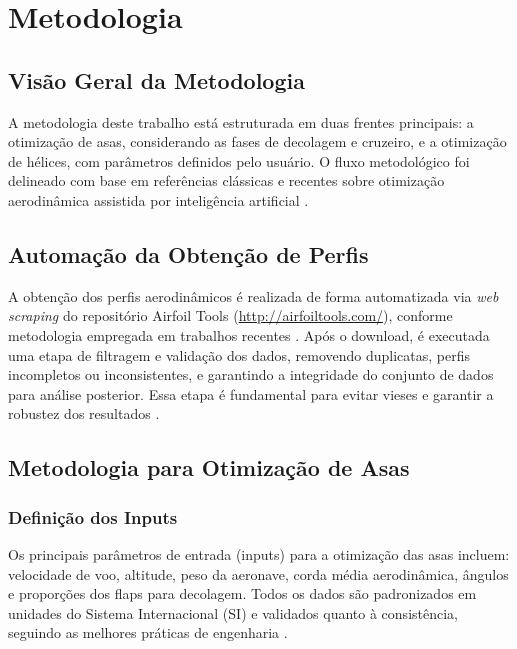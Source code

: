 \chapter{Metodologia}

\section{Visão Geral da Metodologia}
A metodologia deste trabalho está estruturada em duas frentes principais: a otimização de asas, considerando as fases de decolagem e cruzeiro, e a otimização de hélices, com parâmetros definidos pelo usuário. O fluxo metodológico foi delineado com base em referências clássicas e recentes sobre otimização aerodinâmica assistida por inteligência artificial \cite{oliveira2023, hasan2024, wu2024}.

\section{Automação da Obtenção de Perfis}
\label{sec:automacao}
A obtenção dos perfis aerodinâmicos é realizada de forma automatizada via \textit{web scraping} do repositório Airfoil Tools (\url{http://airfoiltools.com/}), conforme metodologia empregada em trabalhos recentes \cite{oliveira2023}. Após o download, é executada uma etapa de filtragem e validação dos dados, removendo duplicatas, perfis incompletos ou inconsistentes, e garantindo a integridade do conjunto de dados para análise posterior. Essa etapa é fundamental para evitar vieses e garantir a robustez dos resultados \cite{abbott1959theory}.

\section{Metodologia para Otimização de Asas}
\subsection{Definição dos Inputs}
\label{subsec:inputs}
Os principais parâmetros de entrada (inputs) para a otimização das asas incluem: velocidade de voo, altitude, peso da aeronave, corda média aerodinâmica, ângulos e proporções dos flaps para decolagem. Todos os dados são padronizados em unidades do Sistema Internacional (SI) e validados quanto à consistência, seguindo as melhores práticas de engenharia \cite{anderson2017fundamentals, raymer2018aircraft}.

